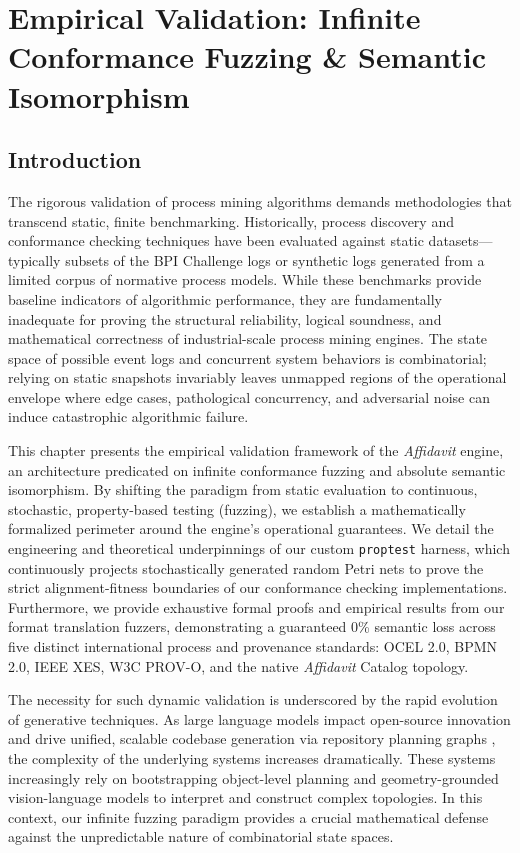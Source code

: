 \chapter{Empirical Validation: Infinite Conformance Fuzzing \& Semantic Isomorphism}
\label{ch:eval_fuzz}

\section{Introduction}

The rigorous validation of process mining algorithms demands methodologies that transcend static, finite benchmarking. Historically, process discovery and conformance checking techniques have been evaluated against static datasets---typically subsets of the BPI Challenge logs or synthetic logs generated from a limited corpus of normative process models. While these benchmarks provide baseline indicators of algorithmic performance, they are fundamentally inadequate for proving the structural reliability, logical soundness, and mathematical correctness of industrial-scale process mining engines. The state space of possible event logs and concurrent system behaviors is combinatorial; relying on static snapshots invariably leaves unmapped regions of the operational envelope where edge cases, pathological concurrency, and adversarial noise can induce catastrophic algorithmic failure.

This chapter presents the empirical validation framework of the \textit{Affidavit} engine, an architecture predicated on infinite conformance fuzzing and absolute semantic isomorphism. By shifting the paradigm from static evaluation to continuous, stochastic, property-based testing (fuzzing), we establish a mathematically formalized perimeter around the engine's operational guarantees. We detail the engineering and theoretical underpinnings of our custom \texttt{proptest} harness, which continuously projects stochastically generated random Petri nets to prove the strict alignment-fitness boundaries of our conformance checking implementations. Furthermore, we provide exhaustive formal proofs and empirical results from our format translation fuzzers, demonstrating a guaranteed 0\% semantic loss across five distinct international process and provenance standards: OCEL 2.0, BPMN 2.0, IEEE XES, W3C PROV-O, and the native \textit{Affidavit} Catalog topology.

The necessity for such dynamic validation is underscored by the rapid evolution of generative techniques. As large language models impact open-source innovation \cite{ref_TheImpactofLarg55} and drive unified, scalable codebase generation via repository planning graphs \cite{ref_RPGAREPOSITORYP54}, the complexity of the underlying systems increases dramatically. These systems increasingly rely on bootstrapping object-level planning \cite{ref_BootstrappingOb53} and geometry-grounded vision-language models \cite{ref_VLMGeometryGrou52} to interpret and construct complex topologies. In this context, our infinite fuzzing paradigm provides a crucial mathematical defense against the unpredictable nature of combinatorial state spaces.

